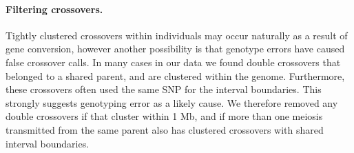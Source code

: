 


\paragraph{Filtering crossovers.}
Tightly clustered crossovers within individuals may occur naturally as a result of gene conversion, however another possibility is that genotype errors have caused false crossover calls.
In many cases in our data we found double crossovers that belonged to a shared parent, and are clustered within the genome.
Furthermore, these crossovers often used the same SNP for the interval boundaries.
This strongly suggests genotyping error as a likely cause.
We therefore removed any double crossovers if that cluster within 1 Mb, and if more than one meiosis transmitted from the same parent also has clustered crossovers with shared interval boundaries.

